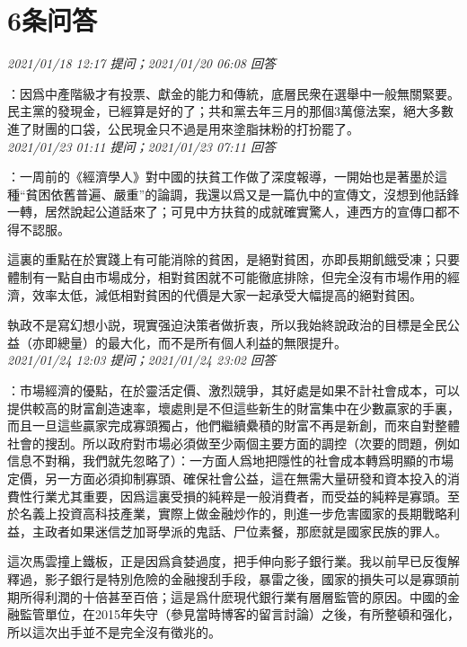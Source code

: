 \documentclass[twocolumn]{ctexart}
\begin{document}
\section{6条问答}

\textit{\hfill\noindent\small 2021/01/18 12:17 提问；2021/01/20 06:08 回答}

：因爲中產階級才有投票、獻金的能力和傳統，底層民衆在選舉中一般無關緊要。民主黨的發現金，已經算是好的了；共和黨去年三月的那個3萬億法案，絕大多數進了財團的口袋，公民現金只不過是用來塗脂抹粉的打扮罷了。
\\

\textit{\hfill\noindent\small 2021/01/23 01:11 提问；2021/01/23 07:11 回答}

：一周前的《經濟學人》對中國的扶貧工作做了深度報導，一開始也是著墨於這種“貧困依舊普遍、嚴重”的論調，我還以爲又是一篇仇中的宣傳文，沒想到他話鋒一轉，居然說起公道話來了；可見中方扶貧的成就確實驚人，連西方的宣傳口都不得不認服。

這裏的重點在於實踐上有可能消除的貧困，是絕對貧困，亦即長期飢餓受凍；只要體制有一點自由市場成分，相對貧困就不可能徹底排除，但完全沒有市場作用的經濟，效率太低，減低相對貧困的代價是大家一起承受大幅提高的絕對貧困。

執政不是寫幻想小説，現實强迫決策者做折衷，所以我始終說政治的目標是全民公益（亦即總量）的最大化，而不是所有個人利益的無限提升。
\\

\textit{\hfill\noindent\small 2021/01/24 12:03 提问；2021/01/24 23:02 回答}

：市場經濟的優點，在於靈活定價、激烈競爭，其好處是如果不計社會成本，可以提供較高的財富創造速率，壞處則是不但這些新生的財富集中在少數贏家的手裏，而且一旦這些贏家完成寡頭獨占，他們繼續纍積的財富不再是新創，而來自對整體社會的搜刮。所以政府對市場必須做至少兩個主要方面的調控（次要的問題，例如信息不對稱，我們就先忽略了）：一方面人爲地把隱性的社會成本轉爲明顯的市場定價，另一方面必須抑制寡頭、確保社會公益，這在無需大量研發和資本投入的消費性行業尤其重要，因爲這裏受損的純粹是一般消費者，而受益的純粹是寡頭。至於名義上投資高科技產業，實際上做金融炒作的，則進一步危害國家的長期戰略利益，主政者如果迷信芝加哥學派的鬼話、尸位素餐，那麽就是國家民族的罪人。

這次馬雲撞上鐵板，正是因爲貪婪過度，把手伸向影子銀行業。我以前早已反復解釋過，影子銀行是特別危險的金融搜刮手段，暴雷之後，國家的損失可以是寡頭前期所得利潤的十倍甚至百倍；這是爲什麽現代銀行業有層層監管的原因。中國的金融監管單位，在2015年失守（參見當時博客的留言討論）之後，有所整頓和强化，所以這次出手並不是完全沒有徵兆的。
\\
\end{document}
